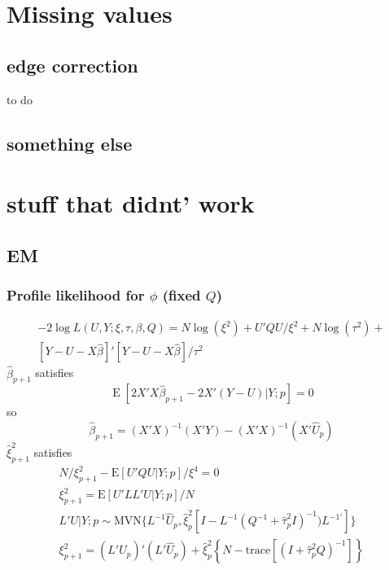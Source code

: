 \documentclass[12pt]{article}
\DeclareMathOperator{\E}{E}
\begin{document}
\section*{Missing values}

\subsection{edge correction}
to do

\subsection{something else}

\appendix

\section{stuff that didnt' work}


\subsection{EM}

\subsubsection{Profile likelihood for $\phi$ (fixed $Q$)}
\begin{multline*}
-2 \log L(U,Y;\xi,\tau,\beta,Q) =
	N\log(\xi^2) + U'Q U/\xi^2 +
	N\log(\tau^2) +\\
	[Y-U-X\hat\beta]'[Y-U-X\hat\beta]/\tau^2
	\end{multline*}
$\hat\beta_{p+1}$ satisfies
\[
\E[ 2  X' X \hat\beta_{p+1} - 2 X'(Y - U) |Y ; p] = 0
 \]
 so
\[
 \hat\beta_{p+1} = (X'X)^{-1}(X'Y) - (X'X)^{-1}(X'\hat U_p)
\]
$\hat\xi^2_{p+1}$ satisfies
\begin{gather*}
N/\xi^2_{p+1} - \text{E}[ U'Q U |Y; p ]/\xi^4 = 0\\
\xi^2_{p+1} = \text{E}[ U'L L' U |Y; p ]/N\\
L'U|Y;p \sim  \text{MVN}\{
	L^{-1}\hat U_p,
\hat\xi_p^2[I - L^{-1}( Q^{-1} + \hat\tau_p^2 I  )^{-1}) L^{-1\prime}] \}\\
\xi^2_{p+1} = (L' \hat U_p )'(L'\hat U_p) + \hat\xi_p^2\left\{N-
\text{trace}\left[(I + \hat\tau_p^2 Q  )^{-1} \right]\right\}
\end{gather*}
\end{document}
